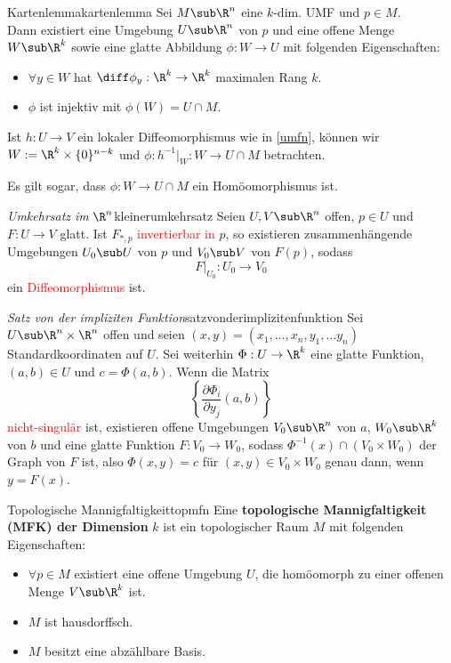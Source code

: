 \begin{lemma}{Kartenlemma}{kartenlemma}
Sei $M \sub \R^n$ eine $k$-dim. UMF und $p \in M$.\\
Dann existiert eine Umgebung $U \sub \R^n$ von $p$ und eine offene Menge $W \sub \R^k$ sowie eine glatte Abbildung $\phi: W \to U$ mit folgenden Eigenschaften:
\begin{itemize}
\item $\forall y \in W$ hat $\diff \phi_y: \R^k \to \R^k$ maximalen Rang $k$.
\item $\phi$ ist injektiv mit $\phi(W) = U \cap M$.
\end{itemize}
\end{lemma}
\begin{beweis}
Ist $h: U \to V$ ein lokaler Diffeomorphismus wie in \ref{umfn}, können wir $W := \R^k \times \{ 0 \}^{n-k}$ und $\phi: h^{-1}|_W : W \to U \cap M$ betrachten.
\end{beweis}
Es gilt sogar, dass $\phi: W \to U \cap M$ ein Homöomorphismus ist.\\
\begin{theorem}{\textit{Umkehrsatz im} $\R^n$}{kleinerumkehrsatz}
Seien $U,V \sub \R^n$ offen, $p \in U$ und $F: U \to V$ glatt. Ist $F_{\ast,p}$ \textcolor{red}{invertierbar in} $p$, so existieren zusammenhängende Umgebungen $U_0 \sub U$ von $p$ und $V_0 \sub V$ von $F(p)$, sodass
\begin{equation}
F|_{U_0}: U_0 \to V_0
\end{equation} 
ein \textcolor{red}{Diffeomorphismus} ist.
\end{theorem}
\begin{theorem}{\textit{Satz von der impliziten Funktion}}{satzvonderimplizitenfunktion}
Sei $U \sub \R^n \times \R^n$ offen und seien $(x,y) = (x_1, \dots, x_n, y_1, \dots y_n)$ Standardkoordinaten auf $U$. Sei weiterhin $\Phi: U \to \R^k$ eine glatte Funktion, $(a,b) \in U$ und $c=\Phi(a,b)$. Wenn die Matrix
\begin{equation}
\left\{ \frac{\partial \Phi_i}{\partial y_j}(a,b)\right\}
\end{equation}
\textcolor{red}{nicht-singulär} ist, existieren offene Umgebungen $V_0 \sub \R^n$ von $a$, $W_0 \sub \R^k$ von $b$ und eine glatte Funktion $F: V_0 \to W_0$, sodass $\Phi^{-1}(x) \cap (V_0 \times W_0)$ der Graph von $F$ ist, also $\Phi(x,y)=c$ für $(x,y) \in V_0 \times W_0$ genau dann, wenn $y=F(x)$.
\end{theorem}
\begin{definition}{Topologische Mannigfaltigkeit}{topmfn}
Eine \textbf{topologische Mannigfaltigkeit (MFK) der Dimension} $k$ ist ein topologischer Raum $M$ mit folgenden Eigenschaften:
\begin{itemize}
\item $\forall p \in M$ existiert eine offene Umgebung $U$, die homöomorph zu einer offenen Menge $V \sub \R^k$ ist.
\item $M$ ist hausdorffsch.
\item $M$ besitzt eine abzählbare Basis.
\end{itemize}
\end{definition}
